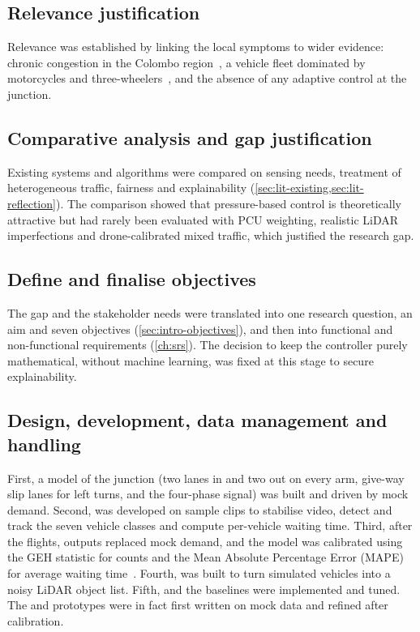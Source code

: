 \subsection{Relevance justification}
Relevance was established by linking the local symptoms to wider evidence: chronic congestion in the Colombo region~\cite{jica2014comtrans}, a vehicle fleet dominated by motorcycles and three-wheelers~\cite{dmt_stats}, and the absence of any adaptive control at the junction.

\subsection{Comparative analysis and gap justification}
Existing systems and algorithms were compared on sensing needs, treatment of heterogeneous traffic, fairness and explainability (\cref{sec:lit-existing,sec:lit-reflection}). The comparison showed that pressure-based control is theoretically attractive but had rarely been evaluated with PCU weighting, realistic LiDAR imperfections and drone-calibrated mixed traffic, which justified the research gap.

\subsection{Define and finalise objectives}
The gap and the stakeholder needs were translated into one research question, an aim and seven objectives (\cref{sec:intro-objectives}), and then into functional and non-functional requirements (\cref{ch:srs}). The decision to keep the controller purely mathematical, without machine learning, was fixed at this stage to secure explainability.

\subsection{Design, development, data management and handling}
First, a \sumo{} model of the junction (two lanes in and two out on every arm, give-way slip lanes for left turns, and the four-phase signal) was built and driven by mock demand. Second, \dtx{} was developed on sample clips to stabilise video, detect and track the seven vehicle classes and compute per-vehicle waiting time. Third, after the flights, \dtx{} outputs replaced mock demand, and the model was calibrated using the GEH statistic for counts and the Mean Absolute Percentage Error (MAPE) for average waiting time~\cite{dowling2004toolbox}. Fourth, \vls{} was built to turn simulated vehicles into a noisy LiDAR object list. Fifth, \prism{} and the baselines were implemented and tuned. The \vls{} and \prism{} prototypes were in fact first written on mock data and refined after calibration.

